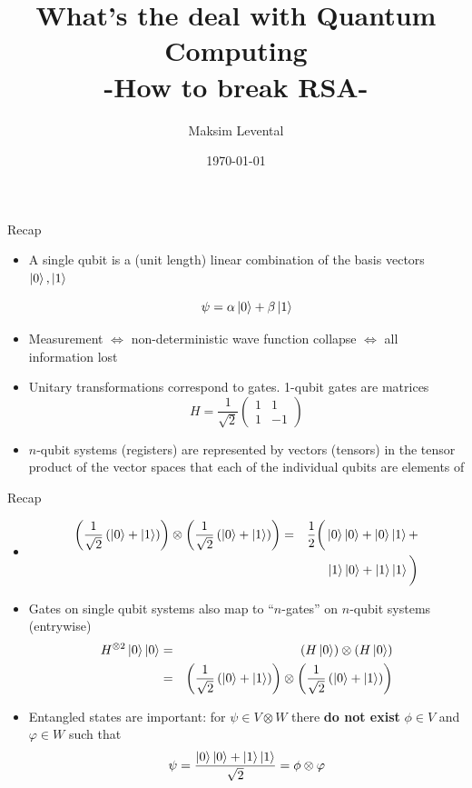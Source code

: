 \documentclass{beamer}
\title[What's the deal with QC]{What's the deal with Quantum Computing\\-How to break RSA-}
\author{Maksim Levental}
\date{\today}
\begin{document}

\begin{frame}
\titlepage
\end{frame}


\begin{frame}{Recap}
  
\begin{itemize}
     \item A single qubit is a (unit length) linear combination of the basis vectors $\Ket{0},\Ket{1}$
  
       \[
       \psi=\alpha\Ket{0}+\beta\Ket{1}
       \] 
         
     \item Measurement $\iff$ non-deterministic wave function collapse $\iff$ all 
information lost
     \item Unitary transformations correspond to gates. 1-qubit gates are matrices 
       \[
       H=\frac{1}{\sqrt{2}}\begin{pmatrix}1 & 1\\
         1 & -1
       \end{pmatrix}
       \]

       \item $n$-qubit systems (registers) are represented by vectors (tensors) in the 
         tensor product of the vector spaces that each of the individual qubits are 
         elements of
\end{itemize}
\end{frame}

\begin{frame}{Recap}
\begin{itemize}
  \item[] 
    \begin{eqnarray*}
    \left(\frac{1}{\sqrt{2}}\left(\Ket{0}+\Ket{1}\right)\right)\otimes\left(\frac{1}{\sqrt{2}}\left(\Ket{0}+\Ket{1}\right)\right) &=&  \frac{1}{2}\bigg(\Ket{0}\Ket{0}+\Ket{0}\Ket{1}+\\
    &&\Ket{1}\Ket{0}+\Ket{1}\Ket{1}\bigg)
    \end{eqnarray*}
  \item Gates on single qubit systems also map to ``$n$-gates'' on $n$-qubit systems (entrywise)
    \begin{eqnarray*}
      H^{\otimes 2}\Ket{0}\Ket{0} & = & \left(H\Ket{0}\right)\otimes\left(H\Ket{0}\right)\\
                               & = & \left(\frac{1}{\sqrt{2}}\left(\Ket{0}+\Ket{1}\right)\right)\otimes\left(\frac{1}{\sqrt{2}}\left(\Ket{0}+\Ket{1}\right)\right)\\  
    \end{eqnarray*}
  \item Entangled states are important: for $\psi \in V\otimes W$ there \textbf{do not exist} $\phi \in V$ and $\varphi \in W$ such that
    \[
     \psi=\frac{\Ket{0}\Ket{0}+\Ket{1}\Ket{1}}{\sqrt{2}}=\phi\otimes\varphi
    \]
\end{itemize}
\end{frame}
\end{document}
